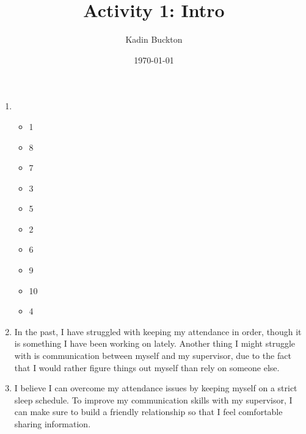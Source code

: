 \documentclass[11pt]{article}
\author{Kadin Buckton}
\date{\today}
\title{Activity 1: Intro}
\begin{document}
\maketitle
\tableofcontents

\begin{enumerate}
\item \begin{itemize}
\item 1
\item 8
\item 7
\item 3
\item 5
\item 2
\item 6
\item 9
\item 10
\item 4
\end{itemize}
\item In the past, I have struggled with keeping my attendance in order, though it is something I have been working on lately. Another thing I might struggle with is communication between myself and my supervisor, due to the fact that I would rather figure things out myself than rely on someone else.
\item I believe I can overcome my attendance issues by keeping myself on a strict sleep schedule. To improve my communication skills with my supervisor, I can make sure to build a friendly relationship so that I feel comfortable sharing information.
\end{enumerate}
\end{document}
